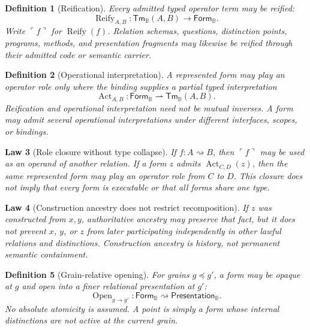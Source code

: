 \documentclass[11pt,oneside]{article}
\newtheorem{definition}{Definition}[section]
\newtheorem{law}[definition]{Law}
\newcommand{\B}{\mathbb B}
\begin{document}
\begin{definition}[Reification]
Every admitted typed operator term may be reified:
\[
\boxed{
\operatorname{Reify}_{A,B}:
\mathsf{Tm}_{\B}(A,B)
\to
\mathsf{Form}_{\B}.
}
\]
Write \(\ulcorner f\urcorner\) for \(\operatorname{Reify}(f)\).  Relation schemas, questions, distinction points, programs, methods, and presentation fragments may likewise be reified through their admitted code or semantic carrier.
\end{definition}

\begin{definition}[Operational interpretation]
A represented form may play an operator role only where the binding supplies a partial typed interpretation
\[
\boxed{
\operatorname{Act}_{A,B}:
\mathsf{Form}_{\B}
\rightharpoonup
\mathsf{Tm}_{\B}(A,B).
}
\]
Reification and operational interpretation need not be mutual inverses.  A form may admit several operational interpretations under different interfaces, scopes, or bindings.
\end{definition}

\begin{law}[Role closure without type collapse]
If \(f:A\rightsquigarrow B\), then \(\ulcorner f\urcorner\) may be used as an operand of another relation.  If a form \(z\) admits \(\operatorname{Act}_{C,D}(z)\), then the same represented form may play an operator role from \(C\) to \(D\).  This closure does not imply that every form is executable or that all forms share one type.
\end{law}

\begin{law}[Construction ancestry does not restrict recomposition]
If \(z\) was constructed from \(x,y\), authoritative ancestry may preserve that fact, but it does not prevent \(x\), \(y\), or \(z\) from later participating independently in other lawful relations and distinctions.  Construction ancestry is history, not permanent semantic containment.
\end{law}

\begin{definition}[Grain-relative opening]
For grains \(g\preceq g'\), a form may be opaque at \(g\) and open into a finer relational presentation at \(g'\):
\[
\boxed{
\operatorname{Open}_{g\to g'}:
\mathsf{Form}_{\B}
\rightsquigarrow
\mathsf{Presentation}_{\B}.
}
\]
No absolute atomicity is assumed.  A point is simply a form whose internal distinctions are not active at the current grain.
\end{definition}
\end{document}
